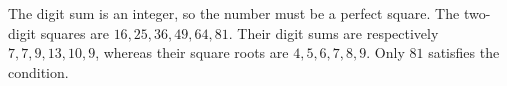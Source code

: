The digit sum is an integer, so the number must be a perfect square. The two-digit squares are $16,25,36,49,64,81$. Their digit sums are respectively $7,7,9,13,10,9$, whereas their square roots are $4,5,6,7,8,9$. Only $\boxed{81}$ satisfies the condition.
